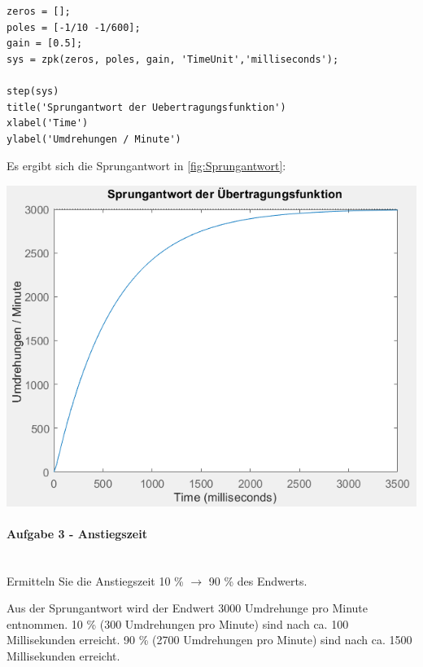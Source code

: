 \documentclass[            %
draft = false,             		%
paper = A4,                		%
pagesize = pdftex,         		%
fontsize = 10pt,           		%
DIV=15,                    		%
twoside = false,           		%
twocolumn = false,         		%
parskip = full,           		%
chapterprefix = false,      		%
appendixprefix = true,     		%
headinclude = false,       		%
footinclude = false,       		%
mpinclude = false,         		%
numbers = auto,            		%
cleardoublepage = plain,   		%
footnotes = multiple,      		%
titlepage = true,          		%
headings = normal,         		%
open = right,              		%
bibliography = openstyle,  		%
listof = chaptergapline,   		%
overfullrule = true,
]{scrbook}
\begin{document}
\begin{lstlisting}[style=CStyle]
zeros = [];
poles = [-1/10 -1/600];
gain = [0.5];
sys = zpk(zeros, poles, gain, 'TimeUnit','milliseconds');

step(sys)
title('Sprungantwort der Uebertragungsfunktion')
xlabel('Time') 
ylabel('Umdrehungen / Minute') 
\end{lstlisting}

Es ergibt sich die Sprungantwort in \ref{fig:Sprungantwort}:

\begin{center}
   \begin{minipage}[b]{0.8\textwidth}
      \includegraphics[scale=1.0]{Bilder/Sprungantwort.PNG}
      \label{fig:Sprungantwort} 
   \end{minipage}
\end{center}







\paragraph{Aufgabe 3 - Anstiegszeit}~\\

Ermitteln Sie die Anstiegszeit 10 \% $\rightarrow$ 90 \% des Endwerts.

Aus der Sprungantwort wird der Endwert 3000 Umdrehunge pro Minute entnommen.
10 \% (300 Umdrehungen pro Minute) sind nach ca. 100 Millisekunden erreicht.
90 \% (2700 Umdrehungen pro Minute) sind nach ca. 1500 Millisekunden erreicht.
\end{document}
